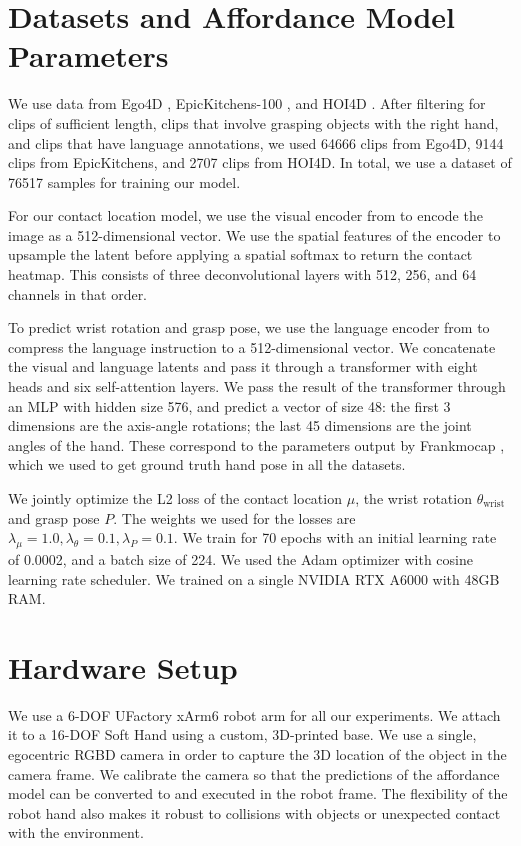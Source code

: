 \section{Datasets and Affordance Model Parameters}

We use data from Ego4D \cite{ego4d}, EpicKitchens-100 \cite{EPICKITCHENS}, and HOI4D \cite{hoi4d}.  After filtering for clips of sufficient length, clips that involve grasping objects with the right hand, and clips that have language annotations, we used 64666 clips from Ego4D, 9144 clips from EpicKitchens, and 2707 clips from HOI4D. In total, we use a dataset of 76517 samples for training our model.

For our contact location model, we use the visual encoder from \cite{r3m} to encode the image as a 512-dimensional vector. We use the spatial features of the encoder to upsample the latent before applying a spatial softmax to return the contact heatmap. This consists of three deconvolutional layers with 512, 256, and 64 channels in that order.

To predict wrist rotation and grasp pose, we use the language encoder from \cite{Clip} to compress the language instruction to a 512-dimensional vector. We concatenate the visual and language latents and pass it through a transformer with eight heads and six self-attention layers. We pass the result of the transformer through an MLP with hidden size 576, and predict a vector of size 48: the first 3 dimensions are the axis-angle rotations; the last 45 dimensions are the joint angles of the hand. These correspond to the parameters output by Frankmocap \cite{FrankMocap_2021_ICCV}, which we used to get ground truth hand pose in all the datasets.

We jointly optimize the L2 loss of the contact location $\mu$, the wrist rotation $\theta_\text{wrist}$ and grasp pose $P$. The weights we used for the losses are $\lambda_\mu = 1.0, \lambda_\theta = 0.1, \lambda_P = 0.1$. We train for 70 epochs with an initial learning rate of 0.0002, and a batch size of 224. We used the Adam optimizer \cite{kingma2014adam} with cosine learning rate scheduler. We trained on a single NVIDIA RTX A6000 with 48GB RAM.

\section{Hardware Setup}

We use a 6-DOF UFactory xArm6 robot arm for all our experiments. We attach it to a 16-DOF Soft Hand using a custom, 3D-printed base. We use a single, egocentric RGBD camera in order to capture the 3D location of the object in the camera frame. We calibrate the camera so that the predictions of the affordance model can be converted to and executed in the robot frame. The flexibility of the robot hand also makes it robust to collisions with objects or unexpected contact with the environment. 

